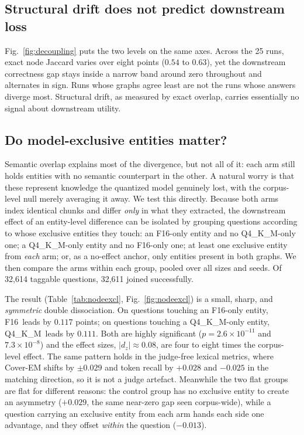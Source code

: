 \documentclass[conference, table]{IEEEtran}
\newcommand{\fsixteen}{F16}
\newcommand{\qfour}{Q4\_K\_M}
\begin{document}
\subsection{Structural drift does not predict downstream loss}



\noindent
Fig.~\ref{fig:decoupling} puts the two levels on the same axes. Across the 25 runs, exact node Jaccard varies over eight points ($0.54$ to $0.63$), yet the downstream correctness gap stays inside a narrow band around zero throughout and alternates in sign. Runs whose graphs agree least are not the runs whose answers diverge most. Structural drift, as measured by exact overlap, carries essentially no signal about downstream utility.




\subsection{Do model-exclusive entities matter?}\label{sec:nodeexcl}

\noindent
Semantic overlap explains most of the divergence, but not all of it: each arm still holds entities with no semantic counterpart in the other. A natural worry is that these represent knowledge the quantized model genuinely lost, with the corpus-level null merely averaging it away. We test this directly. Because both arms index identical chunks and differ \emph{only} in what they extracted, the downstream effect of an entity-level difference can be isolated by grouping questions according to whose exclusive entities they touch: an \fsixteen-only entity and no \qfour-only one; a \qfour-only entity and no \fsixteen-only one; at least one exclusive entity from \emph{each} arm; or, as a no-effect anchor, only entities present in both graphs. We then compare the arms within each group, pooled over all sizes and seeds. Of 32{,}614 taggable questions, 32{,}611 joined successfully.

\noindent
The result (Table~\ref{tab:nodeexcl}, Fig.~\ref{fig:nodeexcl}) is a small, sharp, and \emph{symmetric} double dissociation. On questions touching an \fsixteen-only entity, \fsixteen\ leads by $0.117$ points; on questions touching a \qfour-only entity, \qfour\ leads by $0.111$. Both are highly significant ($p = 2.6\times10^{-11}$ and $7.3\times10^{-8}$) and the effect sizes, $|d_z| \approx 0.08$, are four to eight times the corpus-level effect. The same pattern holds in the judge-free lexical metrics, where Cover-EM shifts by $\pm 0.029$ and token recall by $+0.028$ and $-0.025$ in the matching direction, so it is not a judge artefact. Meanwhile the two flat groups are flat for different reasons: the control group has no exclusive entity to create an asymmetry ($+0.029$, the same near-zero gap seen corpus-wide), while a question carrying an exclusive entity from each arm hands each side one advantage, and they offset \emph{within} the question ($-0.013$).
\end{document}
